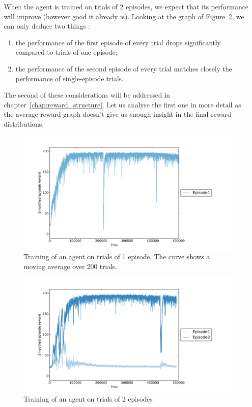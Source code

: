When the agent is trained on trials of 2 episodes, we expect that its
performance will improve (however good it already is). Looking at the graph 
of Figure~\ref{fig:20perms2ep_training}, we can only deduce two things : 
\begin{enumerate}
	\item the performance of the first episode of every trial drops 
		significantly compared to trials of one episode;
	\item the performance of the second episode of every trial matches
		closely the performance of single-episode trials.
\end{enumerate}
The second of these considerations will be addressed in
chapter~\ref{chap:reward_structure}. Let us analyse the first one in more detail
as the average reward graph doesn't give us enough insight in the final
reward distributions.\\

\begin{figure}
	\centering
	\includegraphics[width=0.9\linewidth]{fig/20perms1ep_training.pdf}
	\caption{Training of an agent on trials of 1 episode. The curve
	shows a moving average over 200 trials.}
	\label{fig:20perms1ep_training}
\end{figure}


\begin{figure}
	\centering
	\includegraphics[width=0.9\linewidth]{fig/20perms2ep_training.pdf}
	\caption{Training of an agent on trials of 2 episodes}
	\label{fig:20perms2ep_training}
\end{figure}

